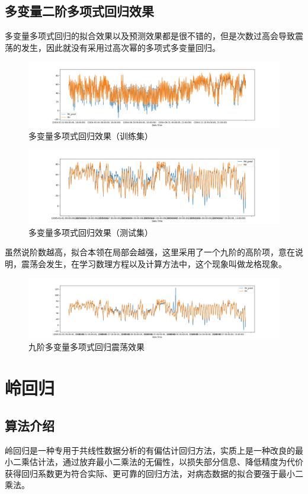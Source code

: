 \documentclass{ctexart}
\begin{document}
\subsection{多变量二阶多项式回归效果}
多变量多项式回归的拟合效果以及预测效果都是很不错的，但是次数过高会导致震荡的发生，因此就没有采用过高次幂的多项式多变量回归。
\begin{figure}[H]
	\includegraphics[width=1.2\textwidth]{../images/poly7.png}
	\caption{多变量多项式回归效果（训练集）}
\end{figure}
\begin{figure}[H]
	\includegraphics[width=1.2\textwidth]{../images/poly8.png}
	\caption{多变量多项式回归效果（测试集）}
\end{figure}
虽然说阶数越高，拟合本领在局部会越强，这里采用了一个九阶的高阶项，意在说明，震荡会发生，在学习数理方程以及计算方法中，这个现象叫做龙格现象。
\begin{figure}[H]
	\includegraphics[width=1.2\textwidth]{../images/poly9.png}
	\caption{九阶多变量多项式回归震荡效果}
\end{figure}
\section{岭回归}
\subsection{算法介绍}
岭回归是一种专用于共线性数据分析的有偏估计回归方法，实质上是一种改良的最小二乘估计法，通过放弃最小二乘法的无偏性，以损失部分信息、降低精度为代价获得回归系数更为符合实际、更可靠的回归方法，对病态数据的拟合要强于最小二乘法。
\end{document}
